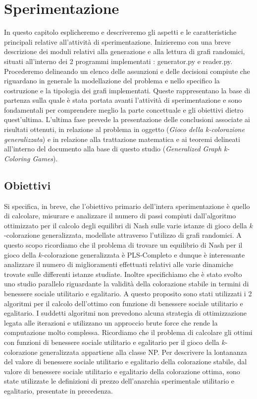 \chapter{Sperimentazione}
\justify
In questo capitolo esplicheremo e descriveremo gli aspetti e le caratteristiche principali relative all'attività di sperimentazione. Inizieremo con una breve descrizione dei moduli relativi alla generazione e alla lettura di grafi randomici, situati all'interno dei 2 programmi implementati : generator.py e reader.py. Procederemo delineando un elenco delle assunzioni e delle decisioni compiute che riguardano in generale la modellazione del problema e nello specifico la costruzione e la tipologia dei grafi implementati. Queste rappresentano la base di partenza sulla quale è stata portata avanti l'attività di sperimentazione e sono fondamentali per comprendere meglio la parte concettuale e gli obiettivi dietro quest'ultima. L'ultima fase prevede la presentazione delle conclusioni associate ai risultati ottenuti, in relazione al problema in oggetto (\textit{Gioco della k-colorazione generalizzata}) e in relazione alla trattazione matematica e ai teoremi delineati all'interno del documento alla base di questo studio (\textit{Generalized Graph k-Coloring Games}).\\

\section{Obiettivi}
\justify
Si specifica, in breve, che l'obiettivo primario dell'intera sperimentazione è quello di calcolare, misurare e analizzare il numero di passi compiuti dall'algoritmo ottimizzato per il calcolo degli equilibri di Nash sulle varie istanze di gioco della $k$-colorazione generalizzata, modellate attraverso l'utilizzo di grafi randomici. A questo scopo ricordiamo che il problema di trovare un equilibrio di Nash per il gioco della $k$-colorazione generalizzata è PLS-Completo e dunque è interessante analizzare il numero di miglioramenti effettuati relativi alle varie dinamiche trovate sulle differenti istanze studiate. Inoltre specifichiamo che è stato svolto uno studio parallelo riguardante la validità della colorazione stabile in termini di benessere sociale utilitario e egalitario. A questo proposito sono stati utilizzati i 2 algoritmi per il calcolo dell'ottimo con funzione di benessere sociale utilitario e egalitario. I suddetti algoritmi non prevedono alcuna strategia di ottimizzazione legata alle iterazioni e utilizzano un approccio brute force che rende la computazione molto complessa. Ricordiamo che il problema di calcolare gli ottimi con funzioni di benessere sociale utilitario e egalitario per il gioco della \(k\)-colorazione generalizzata appartiene alla classe NP. Per descrivere la lontananza del valore di benessere sociale utilitario e egalitario della colorazione stabile, dal valore di benessere sociale utilitario e egalitario della colorazione ottima, sono state utilizzate le definizioni di prezzo dell'anarchia sperimentale utilitario e egalitario, presentate in precedenza.\\


